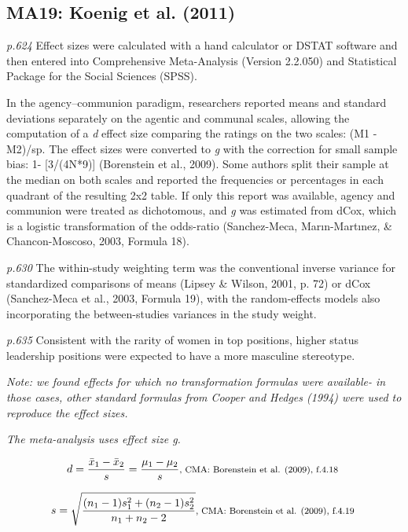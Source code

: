\documentclass{article}
\begin{document}
\subsection*{MA19: Koenig et al. (2011)}

\textit{p.624} Effect sizes were calculated with a hand calculator or DSTAT software and then entered into Comprehensive Meta-Analysis (Version 2.2.050) and Statistical Package for the Social Sciences (SPSS). 

In the agency–communion paradigm, researchers reported means and standard deviations separately on the agentic and communal scales, allowing the computation of a \textit{d} effect size comparing the ratings on the two scales: (M1 - M2)/sp. The effect sizes were converted to \textit{g} with the correction for small sample bias: 1- [3/(4N*9)] (Borenstein et al., 2009). Some authors split their sample at the median on both scales and reported the frequencies or percentages in each quadrant of the resulting 2x2 table. If only this report was available, agency and communion were treated as dichotomous, and \textit{g} was estimated from dCox, which is a logistic transformation of the odds-ratio (Sanchez-Meca, Marın-Martınez, \& Chancon-Moscoso, 2003, Formula 18).

\textit{p.630} The within-study weighting term was the conventional inverse variance for standardized comparisons of means (Lipsey \& Wilson, 2001, p. 72) or dCox (Sanchez-Meca et al., 2003, Formula 19), with the random-effects models also incorporating the between-studies variances in the study weight.

\textit{p.635} Consistent with the rarity of women in top positions, higher status leadership positions were expected to have a more masculine stereotype.

\vspace{3 mm}
\textit{Note: we found effects for which no transformation formulas were available- in those cases, other standard formulas from Cooper and Hedges (1994) were used to reproduce the effect sizes. }

\vspace{3mm}
\textit{The meta-analysis uses effect size g.}

\begin{equation*}
d={\frac {{\bar {x}}_{1}-{\bar {x}}_{2}}{s}}={\frac {\mu_{1}-\mu_{2}}{s}} \mbox{\footnotesize, CMA: Borenstein et al. (2009), f.4.18 } 
\end{equation*}

\begin{equation*}
s={\sqrt {\frac {(n_{1}-1)s_{1}^{2}+(n_{2}-1)s_{2}^{2}}{n_{1}+n_{2}-2}}} \mbox{\footnotesize, CMA: Borenstein et al. (2009), f.4.19 } 
\end{equation*}
\end{document}
